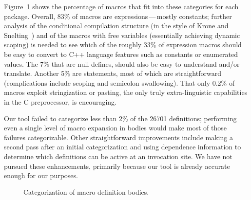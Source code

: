 \documentclass[11pt]{article}
\begin{document}
Figure~\ref{fig:categorization} shows the percentage of macros that fit
into these categories for each package.  Overall, 83\% of macros are
expressions\,---\,mostly constants; further analysis of the conditional
compilation structure (in the style of Krone and Snelting~\cite{Krone94})
and of the macros with free variables (essentially achieving dynamic
scoping) is needed to see which of the roughly 33\% of expression macros
should be easy to convert to C++ language features such as constants or
enumerated values.  The 7\% that are null
defines, should also be easy to understand and/or translate.  Another 5\%
are statements, most of which are straightforward (complications include
scoping and semicolon swallowing).  That only 0.2\% of macros exploit
stringization or pasting, the only truly extra-linguistic capabilities in
the C preprocessor, is encouraging.

Our tool failed to categorize less than 2\% of the 26701 definitions;
performing even a single level of macro expansion in bodies would make most
of those failures categorizable.  Other straightforward improvements
include making a second pass after an initial categorization and using
dependence information to determine which definitions can be active at an
invocation site.  We have not pursued these enhancements, primarily because
our tool is already accurate enough for our purposes.


\begin{figure}
\centerline{}
\caption{Categorization of macro definition bodies.}
\label{fig:categorization}
\end{figure}





\end{document}
